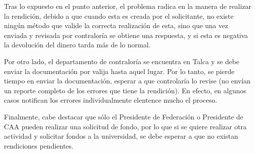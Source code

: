 Tras lo expuesto en el punto anterior, el problema radica en la manera de realizar la rendición, debido a que cuando esta es creada por el solicitante, no existe ningún método que valide la correcta realización de esta, sino que una vez enviada y revisada por contraloría se obtiene una respuesta, y si esta es negativa la devolución del dinero tarda más de lo normal.

Por otro lado, el departamento de contraloría se encuentra en Talca y se debe enviar la documentación por valija hasta aquel lugar. Por lo tanto, se pierde tiempo en enviar la documentación, esperar a que controlaría lo revise (no envían un reporte completo de los errores que tiene la rendición). En efecto, en algunos casos notifican los errores individualmente elentence mucho el proceso.

Finalmente, cabe destacar que sólo el Presidente de Federación o Presidente de CAA pueden realizar una solicitud de fondo, por lo que si se quiere realizar otra actividad y solicitar fondos a la universidad, se debe esperar a que no existan rendiciones pendientes.